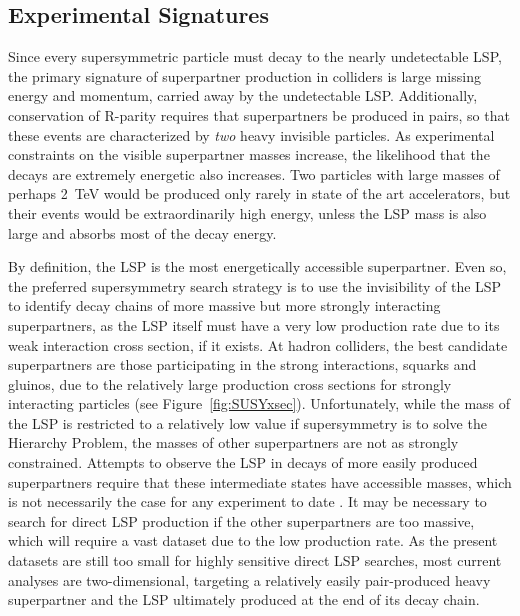   \subsection{Experimental Signatures} \label{sec:SUSYexp}

  Since every supersymmetric particle must decay to the nearly undetectable LSP, the primary signature of superpartner production in colliders is large missing energy and momentum, carried away by the undetectable LSP.
  Additionally, conservation of R-parity requires that superpartners be produced in pairs, so that these events are characterized by {\it two} heavy invisible particles.
  As experimental constraints on the visible superpartner masses increase, the likelihood that the decays are extremely energetic also increases.
  Two particles with large masses of perhaps 2~TeV would be produced only rarely in state of the art accelerators, but their events would be extraordinarily high energy, unless the LSP mass is also large and absorbs most of the decay energy.

  By definition, the LSP is the most energetically accessible superpartner.
  Even so, the preferred supersymmetry search strategy is to use the invisibility of the LSP to identify decay chains of more massive but more strongly interacting superpartners, as the LSP itself must  have a very low production rate due to its weak interaction cross section, if it exists.
  At hadron colliders, the best candidate superpartners are those participating in the strong interactions, squarks and gluinos, due to the relatively large production cross sections for strongly interacting particles (see Figure~\ref{fig:SUSYxsec}). 
  Unfortunately, while the mass of the LSP is restricted to a relatively low value if supersymmetry is to solve the Hierarchy Problem, the masses of other superpartners are not as strongly constrained.
  Attempts to observe the LSP in decays of more easily produced superpartners require that these intermediate states have accessible masses, which is not necessarily the case for any experiment to date \cite{SUSYnaturalness,naturalWIMP}.
  It may be necessary to search for direct LSP production if the other superpartners are too massive, which will require a vast dataset due to the low production rate.
  As the present datasets are still too small for highly sensitive direct LSP searches, most current analyses are two-dimensional, targeting a relatively easily pair-produced heavy superpartner and the LSP ultimately produced at the end of its decay chain.


